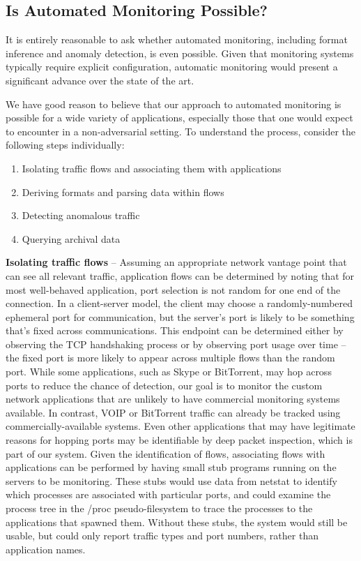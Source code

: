 \subsection{Is Automated Monitoring Possible?}

It is entirely reasonable to ask whether automated monitoring,
including format inference and anomaly detection, is even
possible. Given that monitoring systems typically require explicit
configuration, automatic monitoring would present a significant
advance over the state of the art.

We have good reason to believe that our approach to automated
monitoring is possible for a wide variety of applications, especially
those that one would expect to encounter in a non-adversarial setting.
To understand the process, consider the following steps individually:

\begin{enumerate}
\item Isolating traffic flows and associating them with applications
\item Deriving formats and parsing data within flows
\item Detecting anomalous traffic
\item Querying archival data
\end{enumerate}

{\bf Isolating traffic flows} -- Assuming an appropriate network
vantage point that can see all relevant traffic, application flows can
be determined by noting that for most well-behaved application, port
selection is not random for one end of the connection. In a
client-server model, the client may choose a randomly-numbered
ephemeral port for communication, but the server's port is likely to
be something that's fixed across communications. This endpoint can be
determined either by observing the TCP handshaking process or by
observing port usage over time -- the fixed port is more likely to
appear across multiple flows than the random port. While some
applications, such as Skype or BitTorrent, may hop across ports to
reduce the chance of detection, our goal is to monitor the custom
network applications that are unlikely to have commercial monitoring
systems available. In contrast, VOIP or BitTorrent traffic can already
be tracked using commercially-available systems. Even other
applications that may have legitimate reasons for hopping ports may be
identifiable by deep packet inspection, which is part of our
system. Given the identification of flows, associating flows with
applications can be performed by having small stub programs running on
the servers to be monitoring. These stubs would use data from netstat
to identify which processes are associated with particular ports, and
could examine the process tree in the /proc pseudo-filesystem to trace
the processes to the applications that spawned them. Without these
stubs, the system would still be usable, but could only report traffic
types and port numbers, rather than application names.

